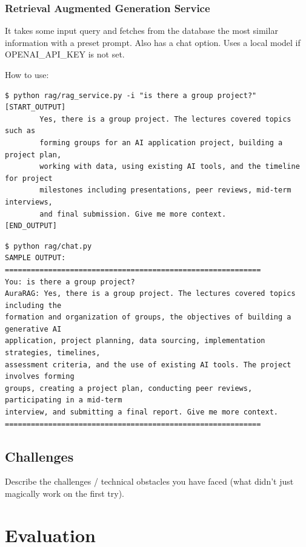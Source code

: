 \documentclass{article}
\begin{document}
\subsubsection{Retrieval Augmented Generation Service}
It takes some input query and fetches from the database the most similar 
information with a preset prompt. Also has a chat option. Uses a local model if OPENAI\_API\_KEY is not set.

How to use:

\begin{verbatim}
$ python rag/rag_service.py -i "is there a group project?"
[START_OUTPUT]
        Yes, there is a group project. The lectures covered topics such as 
        forming groups for an AI application project, building a project plan, 
        working with data, using existing AI tools, and the timeline for project
        milestones including presentations, peer reviews, mid-term interviews,
        and final submission. Give me more context.
[END_OUTPUT]
\end{verbatim}

\begin{verbatim}
$ python rag/chat.py
SAMPLE OUTPUT:
===========================================================
You: is there a group project?
AuraRAG: Yes, there is a group project. The lectures covered topics including the
formation and organization of groups, the objectives of building a generative AI
application, project planning, data sourcing, implementation strategies, timelines,
assessment criteria, and the use of existing AI tools. The project involves forming
groups, creating a project plan, conducting peer reviews, participating in a mid-term
interview, and submitting a final report. Give me more context.
===========================================================
\end{verbatim}

\subsection{Challenges}
Describe the challenges / technical obstacles you have faced (what didn't just magically work on the first try).

\section{Evaluation}
\end{document}
